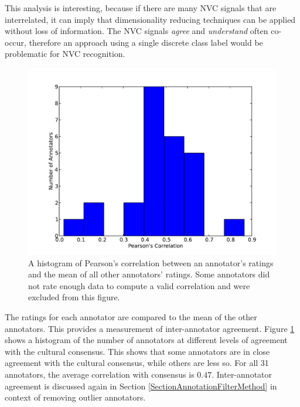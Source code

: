 This analysis is interesting, because if there are many \ac{NVC} signals that are interrelated, it can imply that dimensionality reducing techniques can be applied without loss of information. 
The \ac{NVC} signals \textit{agree} and \textit{understand} often co-occur, therefore an approach using a single discrete class label would be problematic for \ac{NVC} recognition.




\begin{figure}[tb]
\centering
\includegraphics[width = 0.80 \columnwidth]{corpus/AnnotatorCorrelHist.pdf}
\caption{A histogram of Pearson's correlation between an annotator's ratings and the mean of all other annotators' ratings. Some annotators did not rate enough data to compute a valid correlation and were excluded from this figure.}
\label{FigureAnnotatorCorrelationWithConc}
\end{figure}

The ratings for each annotator are compared to the mean of the other annotators. This provides a measurement of inter-annotator agreement. Figure \ref{FigureAnnotatorCorrelationWithConc} shows a histogram of the number of annotators at different levels of agreement with the cultural consensus. This shows that some annotators are in close agreement with the cultural consensus, while others are less so. For all 31 annotators, the average correlation with consensus is $0.47$. Inter-annotator agreement is discussed again in Section \ref{SectionAnnotationFilterMethod} in context of removing outlier annotators.

